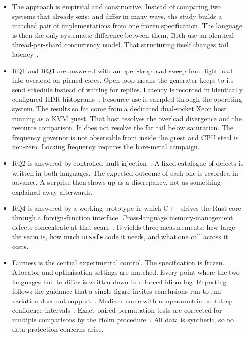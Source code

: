 \documentclass[english,twoside,openright,a4paper,censored,csm,software-track-2020]{HYthesisML}
\begin{document}
\begin{itemize}
  \item The approach is empirical and constructive. Instead of comparing two systems that
        already exist and differ in many ways, the study builds a matched pair of
        implementations from one frozen specification. The language is then the only systematic
        difference between them. Both use an identical thread-per-shard concurrency model. That
        structuring itself changes tail latency~\cite{enberg2019threadpercore}.
  \item RQ1 and RQ3 are answered with an open-loop load sweep from light load into overload on
        pinned cores. Open-loop means the generator keeps to its send schedule instead of
        waiting for replies. Latency is recorded in identically configured HDR
        histograms~\cite{tene_hdrhistogram}. Resource use is sampled through the operating
        system. The results so far come from a dedicated dual-socket Xeon host running as a
        KVM guest. That host resolves the overload divergence and the resource comparison. It
        does not resolve the far tail below saturation. The frequency governor is not observable
        from inside the guest and CPU steal is non-zero. Locking frequency requires the
        bare-metal campaign.
  \item RQ2 is answered by controlled fault injection~\cite{natella2016fault}. A fixed catalogue
        of defects is written in both languages. The expected outcome of each one is recorded in
        advance. A surprise then shows up as a discrepancy, not as something explained away
        afterwards.
  \item RQ4 is answered by a working prototype in which C++ drives the Rust core through a
        foreign-function interface. Cross-language memory-management defects concentrate at that
        seam~\cite{li2022crosslang}. It yields three measurements: how large the seam is, how
        much \texttt{unsafe} code it needs, and what one call across it costs.
  \item Fairness is the central experimental control. The specification is frozen. Allocator and
        optimisation settings are matched. Every point where the two languages had to differ is
        written down in a forced-idiom log. Reporting follows the guidance that a single figure
        invites conclusions run-to-run variation does not
        support~\cite{georges2007rigorous}. Medians come with nonparametric bootstrap confidence
        intervals~\cite{efron1993bootstrap}. Exact paired permutation tests are corrected for
        multiple comparisons by the Holm procedure~\cite{holm1979simple}. All data is synthetic,
        so no data-protection concerns arise.
\end{itemize}
\end{document}
